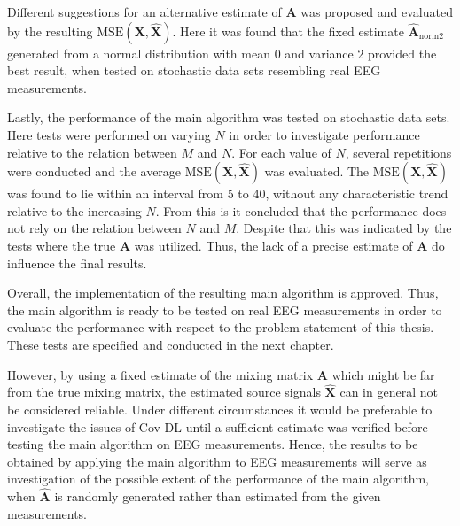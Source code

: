 Different suggestions for an alternative estimate of $\mathbf{A}$ was proposed and evaluated by the resulting $\text{MSE}(\mathbf{X}, \hat{\mathbf{X}})$. 
Here it was found that the fixed estimate $\hat{\mathbf{A}}_{\text{norm2}}$ generated from a normal distribution with mean $0$ and variance $2$ provided the best result, when tested on stochastic data sets resembling real EEG measurements. 

Lastly, the performance of the main algorithm was tested on stochastic data sets. 
Here tests were performed on varying $N$ in order to investigate performance relative to the relation between $M$ and $N$. 
For each value of $N$, several repetitions were conducted and the average $\text{MSE}(\mathbf{X}, \hat{\mathbf{X}})$ was evaluated. 
The $\text{MSE}(\mathbf{X}, \hat{\mathbf{X}})$ was found to lie within an interval from 5 to 40, without any characteristic trend relative to the increasing $N$. 
From this is it concluded that the performance does not rely on the relation between $N$ and $M$. 
Despite that this was indicated by the tests where the true $\mathbf{A}$ was utilized. 
Thus, the lack of a precise estimate of $\mathbf{A}$ do influence the final results. 

Overall, the implementation of the resulting main algorithm is approved. 
Thus, the main algorithm is ready to be tested on real EEG measurements in order to evaluate the performance with respect to the problem statement of this thesis. 
These tests are specified and conducted in the next chapter. 

However, by using a fixed estimate of the mixing matrix $\mathbf{A}$ which might be far from the true mixing matrix, the estimated source signals $\hat{\mathbf{X}}$ can in general not be considered reliable. 
Under different circumstances it would be preferable to investigate the issues of Cov-DL until a sufficient estimate was verified before testing the main algorithm on EEG measurements.
Hence, the results to be obtained by applying the main algorithm to EEG measurements will serve as investigation of the possible extent of the performance of the main algorithm, when $\hat{\textbf{A}}$ is randomly generated rather than estimated from the given measurements.       